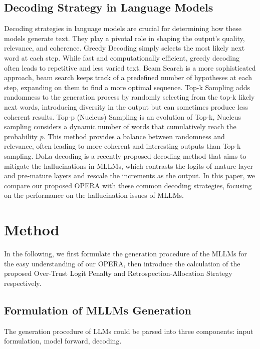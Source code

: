 \documentclass[10pt,twocolumn,letterpaper]{article}
\begin{document}
\subsection{Decoding Strategy in Language Models}
Decoding strategies in language models are crucial for determining how these models generate text. They play a pivotal role in shaping the output's quality, relevance, and coherence. 
Greedy Decoding simply selects the most likely next word at each step. 
While fast and computationally efficient, greedy decoding often leads to repetitive and less varied text.
Beam Search \cite{graves2012sequence,sutskever2014sequence,boulanger2013audio} is a more sophisticated approach, beam search keeps track of a predefined number of hypotheses at each step, expanding on them to find a more optimal sequence. 
Top-k Sampling \cite{fan2018hierarchical} adds randomness to the generation process by randomly selecting from the top-k likely next words, introducing diversity in the output but can sometimes produce less coherent results.
Top-p (Nucleus) Sampling \cite{holtzman2019curious} is an evolution of Top-k, Nucleus sampling considers a dynamic number of words that cumulatively reach the probability $p$. This method provides a balance between randomness and relevance, often leading to more coherent and interesting outputs than Top-k sampling.
DoLa \cite{chuang2023dola} decoding is a recently proposed decoding method that aims to mitigate the hallucinations in MLLMs, which contrasts the logits of mature layer and pre-mature layers and rescale the increments as the output. 
In this paper, we compare our proposed OPERA with these common decoding strategies, focusing on the performance on the hallucination issues of MLLMs.



\section{Method}
\label{sec:method}



In the following, we first formulate the generation procedure of the MLLMs for the easy understanding of our OPERA, then introduce the calculation of the proposed Over-Trust Logit Penalty and Retrospection-Allocation Strategy respectively.

\subsection{Formulation of MLLMs Generation}
\label{mllm_gen}
The generation procedure of LLMs could be parsed into three components: input formulation, model forward, decoding.
\end{document}
